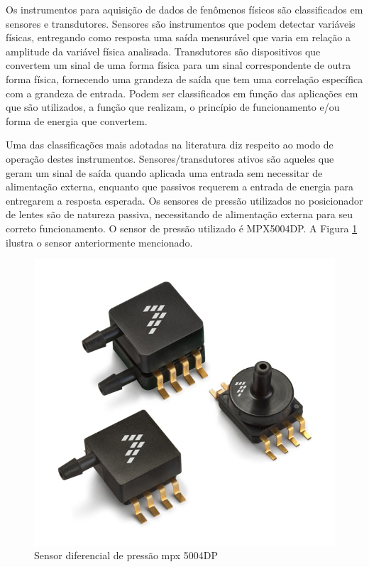 Os instrumentos para aquisição de dados de fenômenos físicos são classificados em sensores e transdutores. Sensores são instrumentos que podem detectar variáveis físicas, entregando como resposta uma saída mensurável que varia em relação a amplitude da variável física analisada. Transdutores são dispositivos que convertem um sinal de uma forma física para um sinal correspondente de outra forma física, fornecendo uma grandeza de saída que tem uma correlação específica com a grandeza de entrada. Podem ser classificados em função das aplicações em que são utilizados, a função que realizam, o princípio de funcionamento e/ou forma de energia que convertem. 

Uma das classificações mais adotadas na literatura diz respeito ao modo de operação destes instrumentos. Sensores/transdutores ativos são aqueles que geram um sinal de saída quando aplicada uma entrada sem necessitar de alimentação externa, enquanto que passivos requerem a entrada de energia para entregarem a resposta esperada. Os sensores de pressão utilizados no posicionador de lentes são de natureza passiva, necessitando de alimentação externa para seu correto funcionamento. O sensor de pressão utilizado é MPX5004DP. A Figura \ref{sensordiferencial} ilustra o sensor anteriormente mencionado.

\begin{figure}[H]
		\centering
			\includegraphics[scale=1.0]{figuras/sensordiferencial.png}
		\caption{Sensor diferencial de pressão mpx 5004DP}
		\label{sensordiferencial}
\end{figure}


